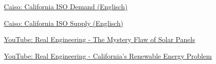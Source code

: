\begin{thebibliography}{9}
        \href{http://www.caiso.com/TodaysOutlook/Pages/index.html}{
            Caiso: California ISO Demand (Englisch)
        }

        \href{http://www.caiso.com/TodaysOutlook/Pages/supply.html}{
            Caiso: California ISO Supply (Englisch)
        }

        \href{https://www.youtube.com/watch?v=yVOnHWnLSeU}{
            YouTube: Real Engineering - The Mystery Flaw of Solar Panels
        }

        \href{https://www.youtube.com/watch?v=h5cm7HOAqZY}{
            YouTube: Real Engineering - California's Renewable Energy Problem
        }
\end{thebibliography}